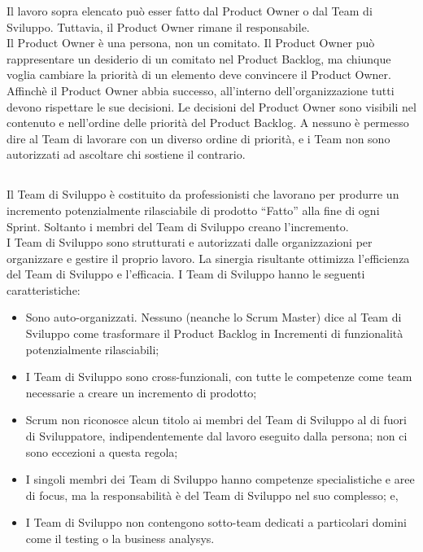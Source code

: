 \noindent Il lavoro sopra elencato pu\`o esser fatto dal Product Owner o dal Team di Sviluppo. Tuttavia, il Product Owner 
rimane il responsabile.  \newline
\\Il Product Owner \`e una persona, non un comitato. Il Product Owner pu\`o rappresentare un desiderio di un comitato nel 
Product Backlog, ma chiunque voglia cambiare la priorit\`a di un elemento deve convincere il Product Owner. \newline
\\Affinch\`e il Product Owner abbia successo, all'interno dell'organizzazione tutti devono rispettare le sue decisioni. Le 
decisioni del Product Owner sono visibili nel contenuto e nell'ordine delle priorit\`a del Product Backlog. A nessuno \`e 
permesso dire al Team di lavorare con un diverso ordine di priorit\`a, e i Team non sono autorizzati ad ascoltare chi sostiene 
il contrario. 

\subsection*{\color{SteelBlue}{Il Team di Sviluppo}}%
\label{sec:development_team}
Il Team di Sviluppo \`e costituito da professionisti che lavorano per produrre un incremento potenzialmente rilasciabile di 
prodotto ``Fatto'' alla fine di ogni Sprint. Soltanto i membri del Team di Sviluppo creano l'incremento. \newline
\\I Team di Sviluppo sono strutturati e autorizzati dalle organizzazioni per organizzare e gestire il proprio lavoro. La 
sinergia risultante ottimizza l'efficienza del Team di Sviluppo e l'efficacia. I Team di Sviluppo hanno le seguenti 
caratteristiche:

\begin{itemize}
	\item Sono auto-organizzati. Nessuno (neanche lo Scrum Master) dice al Team di Sviluppo come trasformare il Product Backlog 
	in Incrementi di funzionalit\`a potenzialmente rilasciabili;
	\item I Team di Sviluppo sono cross-funzionali, con tutte le competenze come team necessarie a creare un incremento di 
	prodotto;
	\item Scrum non riconosce alcun titolo ai membri del Team di Sviluppo al di fuori di Sviluppatore, indipendentemente dal 
	lavoro eseguito dalla persona; non ci sono eccezioni a questa regola;
	\item I singoli membri dei Team di Sviluppo hanno competenze specialistiche e aree di focus, ma la responsabilit\`a \`e del 
	Team di Sviluppo nel suo complesso; e,
	\item I Team di Sviluppo non contengono sotto-team dedicati a particolari domini come il testing o la business analysys.
\end{itemize}

